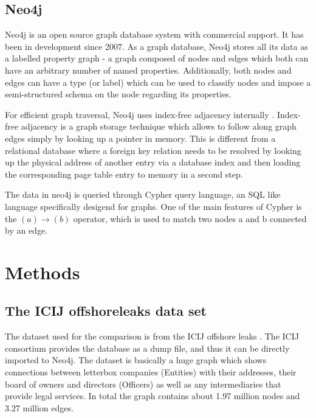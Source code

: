 \documentclass[11pt, a4paper,oneside,chapterprefix=false]{scrbook}
\begin{document}
\section{Neo4j}
Neo4j \cite{neo4j} is an open source graph database system with commercial support.
It has been in development since 2007.
As a graph database, Neo4j stores all its data as a labelled property graph - a graph composed of nodes and edges which both can have an arbitrary number of named properties.
Additionally, both nodes and edges can have a type (or label) which can be used to classify nodes and impose a semi-structured schema on the node regarding its properties.

For efficient graph traversal, Neo4j uses index-free adjacency internally \cite{neo4jinaction:chapter11}.
Index-free adjacency is a graph storage technique which allows to follow along graph edges simply by looking up a pointer in memory.
This is different from a relational database where a foreign key relation needs to be resolved by looking up the physical address of another entry via a database index and then loading the corresponding page table entry to memory in a second step.

The data in neo4j is queried through Cypher query language, an SQL like language specifically desigend for graphs.
One of the main features of Cypher is the $(a)\rightarrow(b)$ operator, which is used to match two nodes a and b connected by an edge.

\chapter{Methods} \label{chp:methods}


\section{The ICIJ offshoreleaks data set} \label{sec:dataset}

The dataset used for the comparison is from the ICIJ offshore leaks \cite{offshoreleaks}.
The ICIJ consortium provides the database as a dump file, and thus it can be directly imported to Neo4j.
The dataset is basically a huge graph which shows connections between letterbox companies (Entities) with their addresses, their board of owners and directors (Officers) as well as any intermediaries that provide legal services. In total the graph contains about  1.97 million nodes and 3.27 million edges.
\end{document}
